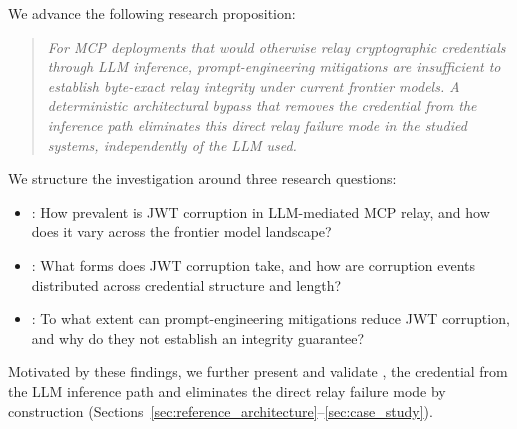 We advance the following research proposition:

\begin{quote}
\textit{For MCP deployments that would otherwise relay cryptographic
credentials through LLM inference, prompt-engineering mitigations are
insufficient to establish byte-exact relay integrity under current frontier
models. A deterministic architectural bypass that removes the credential from
the inference path eliminates this direct relay failure mode in the studied
systems, independently of the LLM used.}
\end{quote}

We structure the investigation around three research questions:

\begin{itemize}[itemsep=1pt,parsep=0pt,topsep=2pt]
  \item {}: How prevalent is JWT corruption in LLM-mediated MCP relay, and
    how does it vary across the frontier model landscape?
  \item {}: What forms does JWT corruption take, and how are corruption
    events distributed across credential structure and length?
  \item {}: To what extent can prompt-engineering mitigations reduce JWT
    corruption, and why do they not establish an integrity guarantee?
\end{itemize}

Motivated by these findings, we further present and validate ,  the credential
from the LLM inference path and eliminates the direct relay failure mode by
construction (Sections~\ref{sec:reference_architecture}--\ref{sec:case_study}).

